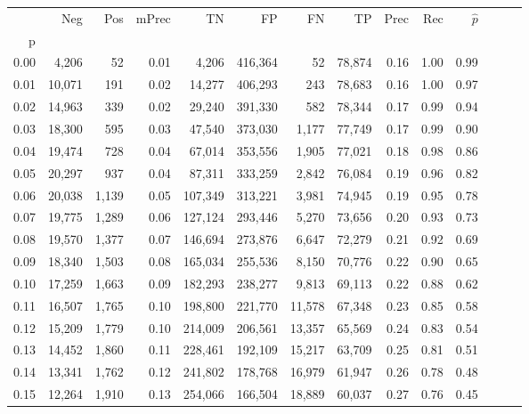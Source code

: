 \begin{tabular}{rrrrrrrrrrrrrr}
\toprule
{} &     Neg &    Pos & mPrec &       TN &       FP &      FN &      TP &  Prec &   Rec & $\hat{p}$ \\
p    &         &        &       &          &          &         &         &       &       &           \\
\midrule
0.00 &   4,206 &     52 &  0.01 &    4,206 &  416,364 &      52 &  78,874 &  0.16 &  1.00 &      0.99 \\
0.01 &  10,071 &    191 &  0.02 &   14,277 &  406,293 &     243 &  78,683 &  0.16 &  1.00 &      0.97 \\
0.02 &  14,963 &    339 &  0.02 &   29,240 &  391,330 &     582 &  78,344 &  0.17 &  0.99 &      0.94 \\
0.03 &  18,300 &    595 &  0.03 &   47,540 &  373,030 &   1,177 &  77,749 &  0.17 &  0.99 &      0.90 \\
0.04 &  19,474 &    728 &  0.04 &   67,014 &  353,556 &   1,905 &  77,021 &  0.18 &  0.98 &      0.86 \\
0.05 &  20,297 &    937 &  0.04 &   87,311 &  333,259 &   2,842 &  76,084 &  0.19 &  0.96 &      0.82 \\
0.06 &  20,038 &  1,139 &  0.05 &  107,349 &  313,221 &   3,981 &  74,945 &  0.19 &  0.95 &      0.78 \\
0.07 &  19,775 &  1,289 &  0.06 &  127,124 &  293,446 &   5,270 &  73,656 &  0.20 &  0.93 &      0.73 \\
0.08 &  19,570 &  1,377 &  0.07 &  146,694 &  273,876 &   6,647 &  72,279 &  0.21 &  0.92 &      0.69 \\
0.09 &  18,340 &  1,503 &  0.08 &  165,034 &  255,536 &   8,150 &  70,776 &  0.22 &  0.90 &      0.65 \\
0.10 &  17,259 &  1,663 &  0.09 &  182,293 &  238,277 &   9,813 &  69,113 &  0.22 &  0.88 &      0.62 \\
0.11 &  16,507 &  1,765 &  0.10 &  198,800 &  221,770 &  11,578 &  67,348 &  0.23 &  0.85 &      0.58 \\
0.12 &  15,209 &  1,779 &  0.10 &  214,009 &  206,561 &  13,357 &  65,569 &  0.24 &  0.83 &      0.54 \\
0.13 &  14,452 &  1,860 &  0.11 &  228,461 &  192,109 &  15,217 &  63,709 &  0.25 &  0.81 &      0.51 \\
0.14 &  13,341 &  1,762 &  0.12 &  241,802 &  178,768 &  16,979 &  61,947 &  0.26 &  0.78 &      0.48 \\
0.15 &  12,264 &  1,910 &  0.13 &  254,066 &  166,504 &  18,889 &  60,037 &  0.27 &  0.76 &      0.45 \\

\end{tabular}
